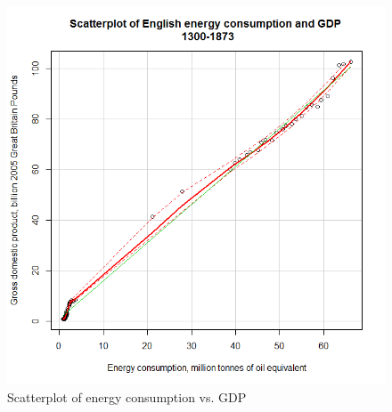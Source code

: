\documentclass[final]{beamer}
\begin{document}
\begin{frame}
\begin{figure}[p!]
\center
\caption{Scatterplot of energy consumption vs. GDP}
\label{fig:scatterplot}
\includegraphics[height=0.8\textheight]{scatterplot.png}
\end{figure}
\end{frame}
\end{document}
